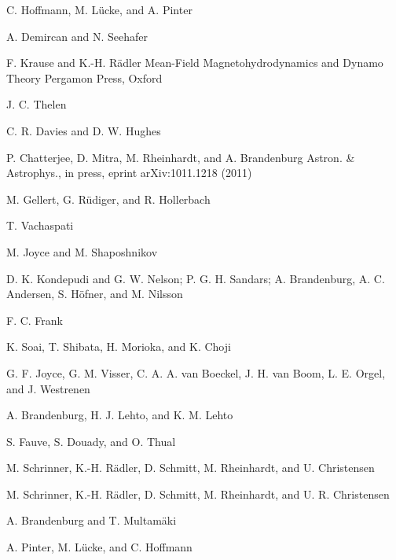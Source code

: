 \documentclass[twocolumn,showpacs,preprintnumbers,superscriptaddress]{revtex4}
\begin{document}
\begin{thebibliography}{}

C. Hoffmann, M. L\"ucke, and A. Pinter 

A. Demircan and N. Seehafer 

F. Krause and K.-H. R\"adler
{Mean-Field Magneto\-hydro\-dy\-na\-mics and Dynamo Theory}
{Pergamon Press, Oxford}

J. C. Thelen

C. R.  Davies and D. W. Hughes

P. Chatterjee, D. Mitra, M. Rheinhardt, and A. Brandenburg
Astron. \& Astrophys., in press, eprint arXiv:1011.1218
(2011)

M. Gellert, G. R\"udiger, and R. Hollerbach

T. Vachaspati

M. Joyce and M. Shaposhnikov

D. K. Kondepudi and G. W. Nelson;
P. G. H. Sandars;
A. Brandenburg, A. C. Andersen, S. H\"ofner, and M. Nilsson

F. C. Frank

K. Soai, T. Shibata, H. Morioka, and K. Choji

G. F. Joyce, G. M. Visser, C. A. A. van Boeckel, J. H. van Boom, L. E. Orgel, and J. Westrenen

A. Brandenburg, H. J. Lehto, and K. M. Lehto

S. Fauve, S. Douady, and O. Thual

M. Schrinner, K.-H. R\"adler, D. Schmitt, M. Rheinhardt, and U. Christensen

M. Schrinner, K.-H. R\"adler, D. Schmitt, M. Rheinhardt, and U. R. Christensen

A. Brandenburg and T. Multam\"aki

A. Pinter, M. L\"ucke, and C. Hoffmann


\end{thebibliography}
\end{document}
